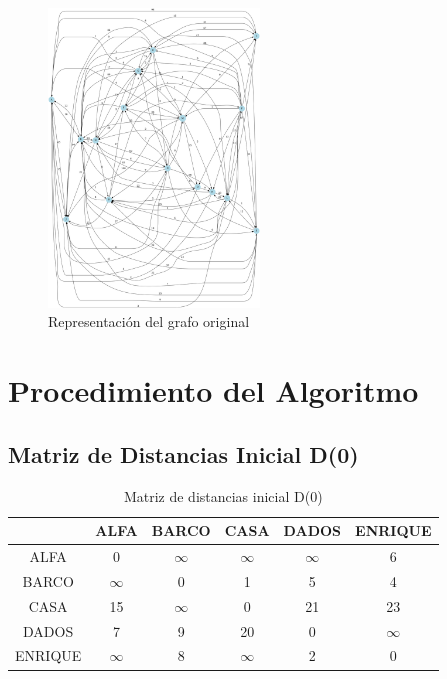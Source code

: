 \documentclass[12pt]{article}
\begin{document}
\begin{figure}[h!]
\centering
\includegraphics[width=0.5\textwidth,keepaspectratio]{grafo.png}
\caption{Representación del grafo original}
\end{figure}

\clearpage
\section{Procedimiento del Algoritmo}
\subsection{Matriz de Distancias Inicial D(0)}
\begin{table}[h!]
\centering
\begin{tabular}{|c|c|c|c|c|c|}
\hline
 & ALFA & BARCO & CASA & DADOS & ENRIQUE \\\hline
ALFA & 0 & $\infty$ & $\infty$ & $\infty$ & 6 \\\hline
BARCO & $\infty$ & 0 & 1 & 5 & 4 \\\hline
CASA & 15 & $\infty$ & 0 & 21 & 23 \\\hline
DADOS & 7 & 9 & 20 & 0 & $\infty$ \\\hline
ENRIQUE & $\infty$ & 8 & $\infty$ & 2 & 0 \\\hline
\end{tabular}
\caption{Matriz de distancias inicial D(0)}
\end{table}

\clearpage
\end{document}
